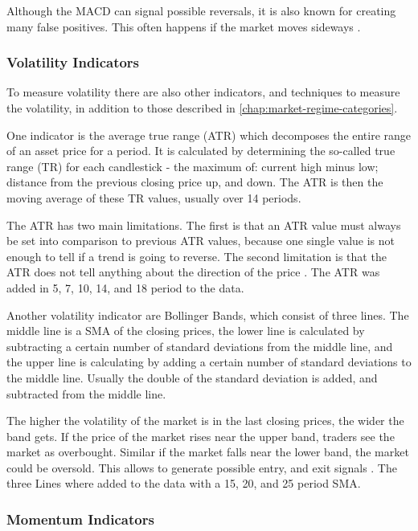 Although the MACD can signal possible reversals, it is also known for creating many false positives.
This often happens if the market moves sideways \cite{investopia-macd}.

\subsubsection{Volatility Indicators}

To measure volatility there are also other indicators, and techniques to measure the volatility, in addition to those described in \autoref{chap:market-regime-categories}.

One indicator is the average true range (ATR) which decomposes the entire range of an asset price for a period.
It is calculated by determining the so-called true range (TR) for each candlestick - the maximum of: current high minus low; distance from the previous closing price up, and down.
The ATR is then the moving average of these TR values, usually over 14 periods.

The ATR has two main limitations.
The first is that an ATR value must always be set into comparison to previous ATR values, because one single value is not enough to tell if a trend is going to reverse.
The second limitation is that the ATR does not tell anything about the direction of the price \cite{investopia-atr}.
The ATR was added in 5, 7, 10, 14, and 18 period to the data.

Another volatility indicator are Bollinger Bands, which consist of three lines.
The middle line is a SMA of the closing prices, the lower line is calculated by subtracting a certain number of standard deviations from the middle line, and the upper line is calculating by adding a certain number of standard deviations to the middle line.
Usually the double of the standard deviation is added, and subtracted from the middle line.

The higher the volatility of the market is in the last closing prices, the wider the band gets.
If the price of the market rises near the upper band, traders see the market as overbought.
Similar if the market falls near the lower band, the market could be oversold.
This allows to generate possible entry, and exit signals \cite{investopia-bb}.
The three Lines where added to the data with a 15, 20, and 25 period SMA.

\subsubsection{Momentum Indicators}

